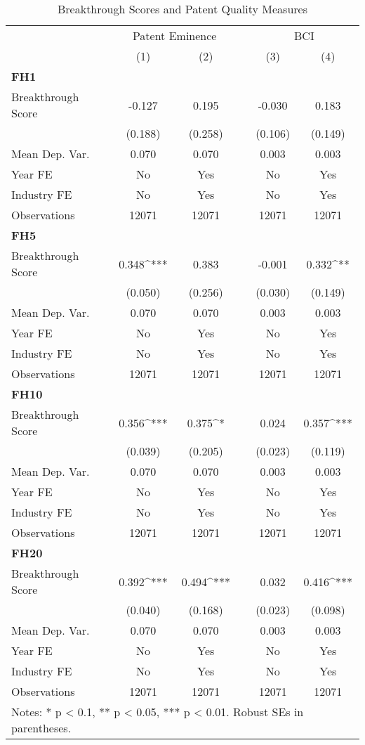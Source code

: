 \begin{table}[H]
\setlength{\tabcolsep}{4pt}
\def\arraystretch{0.9}  
\caption{Breakthrough Scores and Patent Quality Measures}
\centering 
\begin{tabular}{lccccc}
\hline\hline
& \multicolumn{2}{c}{Patent Eminence} && \multicolumn{2}{c}{BCI} \\
& (1) & (2) && (3) & (4) \\
\hline
\multicolumn{6}{l}{\textbf{FH1}} \\
Breakthrough Score & -0.127 & 0.195 && -0.030 & 0.183 \\
& (0.188) & (0.258) & &(0.106) & (0.149)\\
Mean Dep. Var. & 0.070 & 0.070 && 0.003 & 0.003\\
Year FE & No & Yes && No & Yes \\
Industry FE & No & Yes && No & Yes \\
Observations & 12071 & 12071 && 12071 & 12071\\
\hline
\multicolumn{6}{l}{\textbf{FH5}} \\
Breakthrough Score & 0.348^{***} & 0.383 && -0.001 & 0.332^{**} \\
& (0.050) & (0.256) & &(0.030) & (0.149)\\
Mean Dep. Var. & 0.070 & 0.070 && 0.003 & 0.003\\
Year FE & No & Yes && No & Yes \\
Industry FE & No & Yes && No & Yes \\
Observations & 12071 & 12071 && 12071 & 12071\\
\hline
\multicolumn{6}{l}{\textbf{FH10}} \\
Breakthrough Score & 0.356^{***} & 0.375^{*} && 0.024 & 0.357^{***} \\
& (0.039) & (0.205) & &(0.023) & (0.119)\\
Mean Dep. Var. & 0.070 & 0.070 && 0.003 & 0.003\\
Year FE & No & Yes && No & Yes \\
Industry FE & No & Yes && No & Yes \\
Observations & 12071 & 12071 && 12071 & 12071\\
\hline
\multicolumn{6}{l}{\textbf{FH20}} \\
Breakthrough Score & 0.392^{***} & 0.494^{***} && 0.032 & 0.416^{***} \\
& (0.040) & (0.168) & &(0.023) & (0.098)\\
Mean Dep. Var. & 0.070 & 0.070 && 0.003 & 0.003\\
Year FE & No & Yes && No & Yes \\
Industry FE & No & Yes && No & Yes \\
Observations & 12071 & 12071 && 12071 & 12071\\
\hline
\hline
\multicolumn{6}{l}{\footnotesize{Notes: * p < 0.1, ** p < 0.05, *** p < 0.01. Robust SEs in parentheses.}} \\
\end{tabular}
\end{table}
